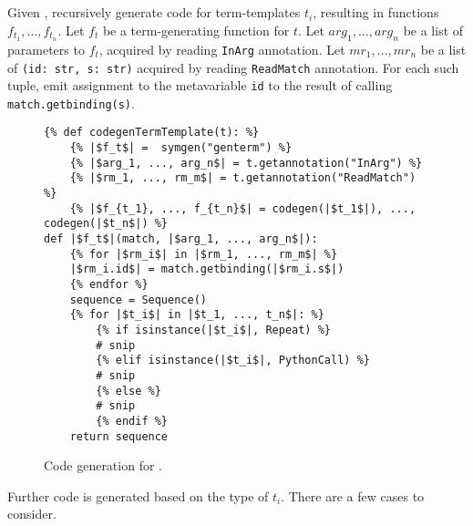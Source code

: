 \subsection{\TermSequenceNoArg}

Given \TermSequence, recursively generate code for term-templates $t_i$, resulting in functions $f_{t_1},..., f_{t_n}$. Let $f_t$ be a term-generating function for $t$. Let $arg_1, ..., arg_n$ be a list of parameters to $f_t$, acquired by reading \texttt{InArg} annotation. Let $mr_1, ..., mr_n$ be a list of \texttt{(id: str, s: str)} acquired by reading \texttt{ReadMatch} annotation. For each such tuple, emit assignment to the metavariable \texttt{id} to the result of calling \texttt{match.getbinding(s)}.


\begin{figure}[ht]
\begin{verbatim}
{% def codegenTermTemplate(t): %}
	{% |$f_t$| =  symgen("genterm") %}
	{% |$arg_1, ..., arg_n$| = t.getannotation("InArg") %}
	{% |$rm_1, ..., rm_m$| = t.getannotation("ReadMatch") %}
	{% |$f_{t_1}, ..., f_{t_n}$| = codegen(|$t_1$|), ..., codegen(|$t_n$|) %}
def |$f_t$|(match, |$arg_1, ..., arg_n$|):
	{% for |$rm_i$| in |$rm_1, ..., rm_m$| %}
	|$rm_i.id$| = match.getbinding(|$rm_i.s$|)
	{% endfor %}
	sequence = Sequence()
	{% for |$t_i$| in |$t_1, ..., t_n$|: %}
		{% if isinstance(|$t_i$|, Repeat) %}
		# snip
		{% elif isinstance(|$t_i$|, PythonCall) %}
		# snip
		{% else %}
		# snip
		{% endif %}
	return sequence
\end{verbatim}
\caption{Code generation for \TermSequenceNoArg.}
\label{codegen-term-sequence}
\end{figure}

Further code is generated based on the type of $t_i$. There are a few cases to consider.

